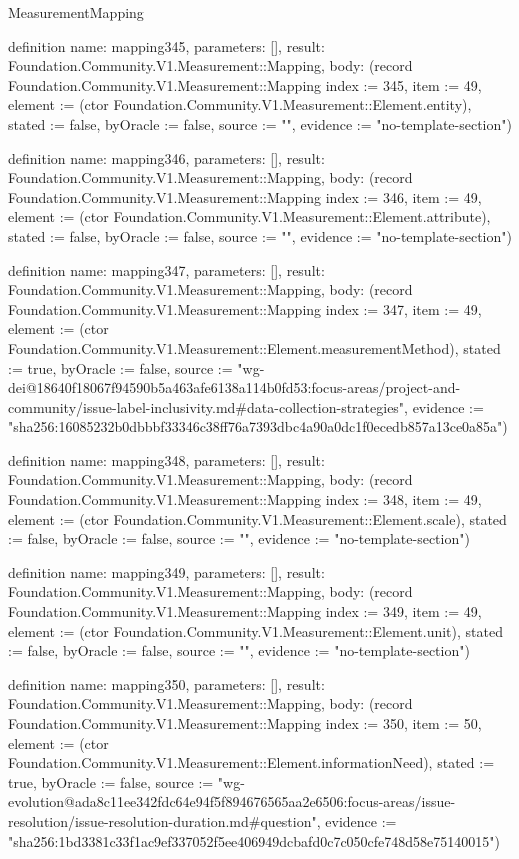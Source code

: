 \begin{lexlean}{MeasurementMapping}
\begin{semanticmodule}
definition{
  name: mapping345,
  parameters: [],
  result: Foundation.Community.V1.Measurement::Mapping,
  body: (record Foundation.Community.V1.Measurement::Mapping {index := 345, item := 49, element := (ctor Foundation.Community.V1.Measurement::Element.entity), stated := false, byOracle := false, source := "", evidence := "no-template-section"})
}

definition{
  name: mapping346,
  parameters: [],
  result: Foundation.Community.V1.Measurement::Mapping,
  body: (record Foundation.Community.V1.Measurement::Mapping {index := 346, item := 49, element := (ctor Foundation.Community.V1.Measurement::Element.attribute), stated := false, byOracle := false, source := "", evidence := "no-template-section"})
}

definition{
  name: mapping347,
  parameters: [],
  result: Foundation.Community.V1.Measurement::Mapping,
  body: (record Foundation.Community.V1.Measurement::Mapping {index := 347, item := 49, element := (ctor Foundation.Community.V1.Measurement::Element.measurementMethod), stated := true, byOracle := false, source := "wg-dei@18640f18067f94590b5a463afe6138a114b0fd53:focus-areas/project-and-community/issue-label-inclusivity.md#data-collection-strategies", evidence := "sha256:16085232b0dbbbf33346c38ff76a7393dbc4a90a0dc1f0ecedb857a13ce0a85a"})
}

definition{
  name: mapping348,
  parameters: [],
  result: Foundation.Community.V1.Measurement::Mapping,
  body: (record Foundation.Community.V1.Measurement::Mapping {index := 348, item := 49, element := (ctor Foundation.Community.V1.Measurement::Element.scale), stated := false, byOracle := false, source := "", evidence := "no-template-section"})
}

definition{
  name: mapping349,
  parameters: [],
  result: Foundation.Community.V1.Measurement::Mapping,
  body: (record Foundation.Community.V1.Measurement::Mapping {index := 349, item := 49, element := (ctor Foundation.Community.V1.Measurement::Element.unit), stated := false, byOracle := false, source := "", evidence := "no-template-section"})
}

definition{
  name: mapping350,
  parameters: [],
  result: Foundation.Community.V1.Measurement::Mapping,
  body: (record Foundation.Community.V1.Measurement::Mapping {index := 350, item := 50, element := (ctor Foundation.Community.V1.Measurement::Element.informationNeed), stated := true, byOracle := false, source := "wg-evolution@ada8c11ee342fdc64e94f5f894676565aa2e6506:focus-areas/issue-resolution/issue-resolution-duration.md#question", evidence := "sha256:1bd3381c33f1ac9ef337052f5ee406949dcbafd0c7c050cfe748d58e75140015"})
}


\end{semanticmodule}
\end{lexlean}
